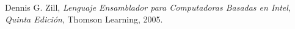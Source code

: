 

\begin{thebibliography}{9}

Dennis G. Zill, \textit{Lenguaje Ensamblador para Computadoras Basadas en Intel, Quinta Edición}, Thomson Learning, 2005. 


\end{thebibliography}

